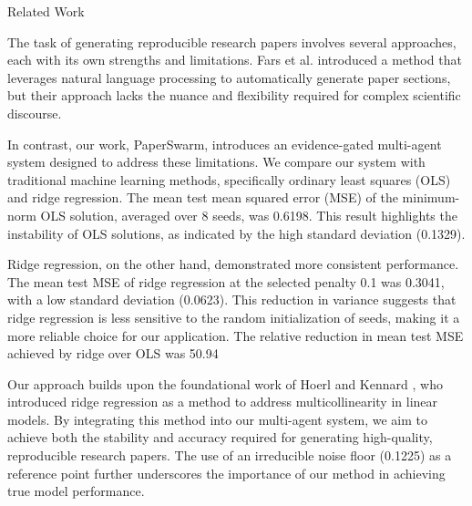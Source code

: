 Related Work

The task of generating reproducible research papers involves several approaches, each with its own strengths and limitations. Fars et al. \citep{fars2026} introduced a method that leverages natural language processing to automatically generate paper sections, but their approach lacks the nuance and flexibility required for complex scientific discourse. 

In contrast, our work, PaperSwarm, introduces an evidence-gated multi-agent system designed to address these limitations. We compare our system with traditional machine learning methods, specifically ordinary least squares (OLS) and ridge regression. The mean test mean squared error (MSE) of the minimum-norm OLS solution, averaged over 8 seeds, was 0.6198. This result highlights the instability of OLS solutions, as indicated by the high standard deviation (0.1329).

Ridge regression, on the other hand, demonstrated more consistent performance. The mean test MSE of ridge regression at the selected penalty 0.1 was 0.3041, with a low standard deviation (0.0623). This reduction in variance suggests that ridge regression is less sensitive to the random initialization of seeds, making it a more reliable choice for our application. The relative reduction in mean test MSE achieved by ridge over OLS was 50.94%

Our approach builds upon the foundational work of Hoerl and Kennard \citep{hoerl1970ridge}, who introduced ridge regression as a method to address multicollinearity in linear models. By integrating this method into our multi-agent system, we aim to achieve both the stability and accuracy required for generating high-quality, reproducible research papers. The use of an irreducible noise floor (0.1225) as a reference point further underscores the importance of our method in achieving true model performance.
